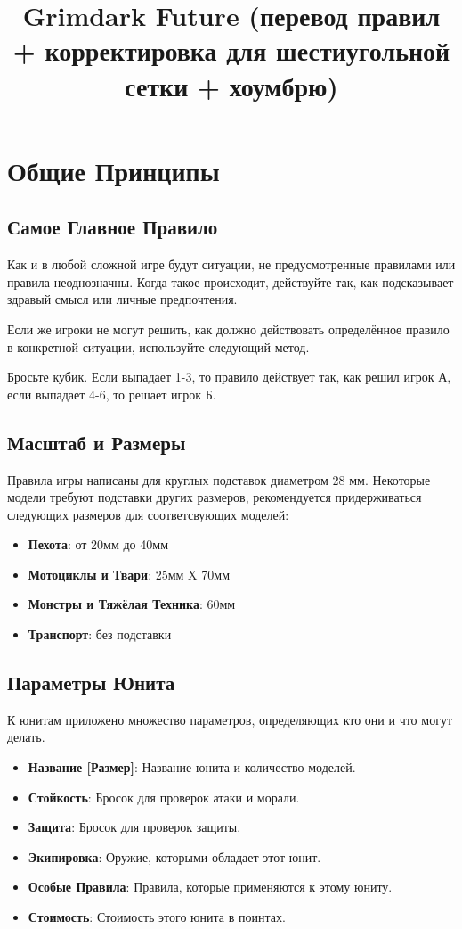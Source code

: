 \documentclass[twocolumn]{article}
\title{Grimdark Future (перевод правил + корректировка для шестиугольной сетки + хоумбрю)}
\newcommand{\dicespan}[2]{\mbox{#1-#2}}
\newcommand{\h}[1]{\textbf{#1}}
\begin{document}
\maketitle
\tableofcontents

\section{Общие Принципы}
\subsection{Самое Главное Правило}

Как и в любой сложной игре будут ситуации, не предусмотренные правилами или правила неоднозначны. Когда такое происходит, действуйте так, как подсказывает здравый смысл или личные предпочтения.

Если же игроки не могут решить, как должно действовать определённое правило в конкретной ситуации, используйте следующий метод.

Бросьте кубик. Если выпадает \dicespan{1}{3}, то правило действует так, как решил игрок А, если выпадает \dicespan{4}{6}, то решает игрок Б.

\subsection{Масштаб и Размеры}
Правила игры написаны для круглых подставок диаметром 28 мм. Некоторые модели требуют подставки других размеров, рекомендуется придерживаться следующих размеров для соответсвующих моделей:

\begin{itemize}
    \item \h{Пехота}: от 20мм до 40мм
    \item \h{Мотоциклы и Твари}: 25мм X 70мм
    \item \h{Монстры и Тяжёлая Техника}: 60мм
    \item \h{Транспорт}: без подставки
\end{itemize}

\subsection{Параметры Юнита}
К юнитам приложено множество параметров, определяющих кто они и что могут делать.

\begin{itemize}
    \item \h{Название [Размер]}: Название юнита и количество моделей.
    \item \h{Стойкость}: Бросок для проверок атаки и морали.
    \item \h{Защита}: Бросок для проверок защиты.
    \item \h{Экипировка}: Оружие, которыми обладает этот юнит.
    \item \h{Особые Правила}: Правила, которые применяются к этому юниту.
    \item \h{Стоимость}: Стоимость этого юнита в поинтах.
\end{itemize}
\end{document}
